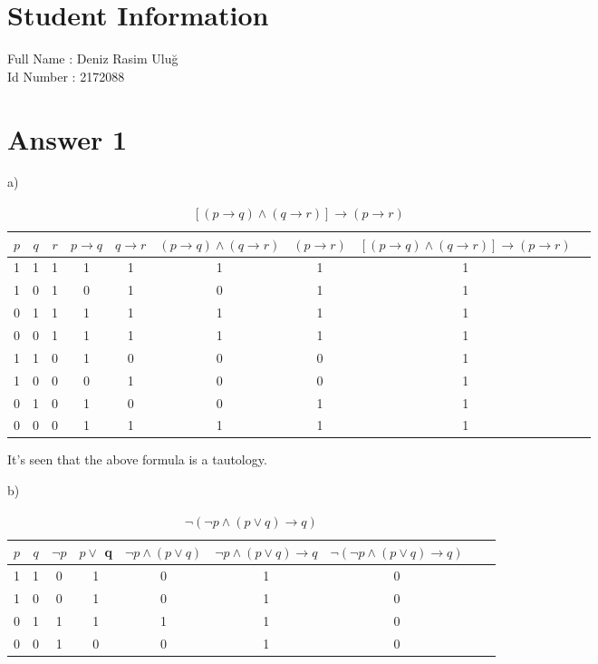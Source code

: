\documentclass[12pt]{article}
\begin{document}
\section*{Student Information } 
Full Name : Deniz Rasim Uluğ \\
Id Number : 2172088 \\

\section*{Answer 1}
 a)
\begin{table}[H]
\small
\centering
\caption{ $ [(p \rightarrow q) \wedge (q \rightarrow r) ] \rightarrow (p \rightarrow r)$  }
\begin{tabular}{|c|c|c|c|c|c|c|c|c|} %
\hline 
$p$ & $q$ & $r$ & $p \to q $& $q \to r$ &$(p \rightarrow q) \wedge (q \rightarrow r)$ & $(p \rightarrow r)$ & $[ (p \rightarrow q) \wedge (q \rightarrow r) ] \rightarrow (p \rightarrow r)$ & \\
\hline
1&1&1&1&1&1&1&1& \\
\hline
1&0&1&0&1&0&1&1& \\
\hline 
0&1&1&1&1&1&1&1& \\
\hline
0&0&1&1&1&1&1&1& \\
\hline
1&1&0&1&0&0&0&1& \\
\hline
1&0&0&0&1&0&0&1& \\
\hline
0&1&0&1&0&0&1&1 \\
\hline
0&0&0&1&1&1&1&1 \\
\hline
\end{tabular}
\end{table}

It's seen that the above formula is a tautology.

b)
\begin{table}[H]
\small
\centering
\caption{  $ \neg ( \neg p \wedge ( p \vee q) \to q) $  }
\begin{tabular}{|c|c|c|c|c|c|c|c|c|} %
\hline 
$p$ & $q$ & $ \neg p $ & $ p \vee$ q & $ \neg p \wedge ( p \vee q) $ &  $ \neg p \wedge ( p \vee q) \to q $ &  $ \neg ( \neg p \wedge ( p \vee q) \to q) $  &  \\
\hline
1&1&0&1&0&1&0& \\
\hline
1&0&0&1&0&1&0& \\
\hline
0&1&1&1&1&1&0& \\
\hline
0&0&1&0&0&1&0& \\
\hline
\end{tabular}
\end{table}
\end{document}
